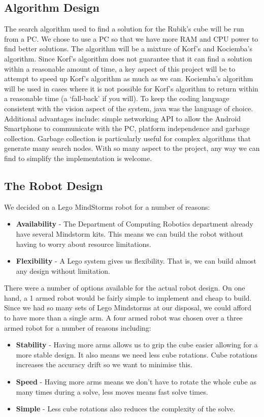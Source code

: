\documentclass[titlepage]{report}[12pt]
\begin{document}
\subsection{Algorithm Design}
The search algorithm used to find a solution for the Rubik's cube will be run from a PC. We chose to use a PC so that we have more RAM and CPU power to find better solutions. The algorithm will be a mixture of Korf's and Kociemba's algorithm. Since Korf's algorithm does not guarantee that it can find a solution within a reasonable amount of time, a key aspect of this project will be to attempt to speed up Korf's algorithm as much as we can. Kociemba's algorithm will be used in cases where it is not possible for Korf's algorithm to return within a reasonable time (a `fall-back' if you will). To keep the coding language consistent with the vision aspect of the system, java was the language of choice. Additional advantages include: simple networking API to allow the Android Smartphone to communicate with the PC, platform independence and garbage collection. Garbage collection is particularly useful for complex algorithms that generate many search nodes. With so many aspect to the project, any way we can find to simplify the implementation is welcome.

\subsection{The Robot Design}
We decided on a Lego MindStorms robot for a number of reasons:
\begin{itemize}
\item \textbf{Availability} - The Department of Computing Robotics department already have several Mindstorm kits. This means we can build the robot without having to worry about resource limitations.
\item \textbf{Flexibility} - A Lego system gives us flexibility. That is,  we can build almost any design without limitation.
\end{itemize}
There were a number of options available for the actual robot design. On one hand, a 1 armed robot would be fairly simple to implement and cheap to build. Since we had so many sets of Lego Mindstorms at our disposal, we could afford to have more than a single arm. A four armed robot was chosen over a three armed robot for a number of reasons including: 
\begin{itemize}
\item \textbf{Stability} - Having more arms allows us to grip the cube easier allowing for a more stable design. It also means we need less cube rotations. Cube rotations increases the accuracy drift so we want to minimise this.
\item \textbf{Speed} - Having more arms means we don't have to rotate the whole cube as many times during a solve, less moves means fast solve times.
\item \textbf{Simple} - Less cube rotations also reduces the complexity of the solve.
\end{itemize}
\end{document}
